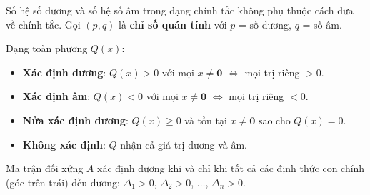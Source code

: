 \documentclass[12pt,a4paper]{article}
\begin{document}
\begin{dinhly}[title={Luật quán tính Sylvester}]
  Số hệ số dương và số hệ số âm trong dạng chính tắc không phụ thuộc cách đưa về chính tắc. Gọi $(p, q)$ là \textbf{chỉ số quán tính} với $p$ = số dương, $q$ = số âm.
\end{dinhly}

\begin{dinhnghia}[title={Xác định dấu}]
  Dạng toàn phương $Q(x)$:
  \begin{itemize}
    \item \textbf{Xác định dương}: $Q(x) > 0$ với mọi $x \ne \mathbf{0}$ $\Leftrightarrow$ mọi trị riêng $> 0$.
    \item \textbf{Xác định âm}: $Q(x) < 0$ với mọi $x \ne \mathbf{0}$ $\Leftrightarrow$ mọi trị riêng $< 0$.
    \item \textbf{Nửa xác định dương}: $Q(x) \ge 0$ và tồn tại $x \ne \mathbf{0}$ sao cho $Q(x) = 0$.
    \item \textbf{Không xác định}: $Q$ nhận cả giá trị dương và âm.
  \end{itemize}
\end{dinhnghia}

\begin{phuongphap}[title={Tiêu chuẩn Sylvester}]
  Ma trận đối xứng $A$ xác định dương khi và chỉ khi tất cả các định thức con chính (góc trên-trái) đều dương: $\Delta_1 > 0$, $\Delta_2 > 0$, $\ldots$, $\Delta_n > 0$.
\end{phuongphap}
\end{document}
